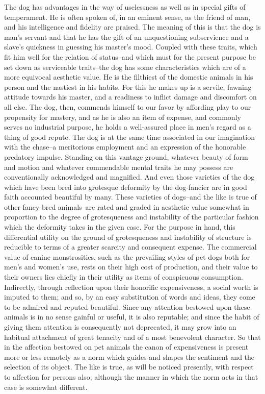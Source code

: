 \documentclass[12pt]{report}
\begin{document}
The dog has advantages in the way of uselessness as well as in special
gifts of temperament. He is often spoken of, in an eminent sense, as
the friend of man, and his intelligence and fidelity are praised. The
meaning of this is that the dog is man's servant and that he has
the gift of an unquestioning subservience and a slave's quickness in
guessing his master's mood. Coupled with these traits, which fit him
well for the relation of status--and which must for the present purpose
be set down as serviceable traits--the dog has some characteristics
which are of a more equivocal aesthetic value. He is the filthiest of
the domestic animals in his person and the nastiest in his habits. For
this he makes up is a servile, fawning attitude towards his master, and
a readiness to inflict damage and discomfort on all else. The dog, then,
commends himself to our favor by affording play to our propensity for
mastery, and as he is also an item of expense, and commonly serves no
industrial purpose, he holds a well-assured place in men's regard as
a thing of good repute. The dog is at the same time associated in our
imagination with the chase--a meritorious employment and an expression
of the honorable predatory impulse. Standing on this vantage ground,
whatever beauty of form and motion and whatever commendable mental
traits he may possess are conventionally acknowledged and magnified.
And even those varieties of the dog which have been bred into grotesque
deformity by the dog-fancier are in good faith accounted beautiful by
many. These varieties of dogs--and the like is true of other fancy-bred
animals--are rated and graded in aesthetic value somewhat in proportion
to the degree of grotesqueness and instability of the particular fashion
which the deformity takes in the given case. For the purpose in hand,
this differential utility on the ground of grotesqueness and instability
of structure is reducible to terms of a greater scarcity and consequent
expense. The commercial value of canine monstrosities, such as the
prevailing styles of pet dogs both for men's and women's use, rests
on their high cost of production, and their value to their owners
lies chiefly in their utility as items of conspicuous consumption.
Indirectly, through reflection upon their honorific expensiveness,
a social worth is imputed to them; and so, by an easy substitution of
words and ideas, they come to be admired and reputed beautiful. Since
any attention bestowed upon these animals is in no sense gainful
or useful, it is also reputable; and since the habit of giving them
attention is consequently not deprecated, it may grow into an habitual
attachment of great tenacity and of a most benevolent character. So that
in the affection bestowed on pet animals the canon of expensiveness
is present more or less remotely as a norm which guides and shapes the
sentiment and the selection of its object. The like is true, as will be
noticed presently, with respect to affection for persons also; although
the manner in which the norm acts in that case is somewhat different.
\end{document}
